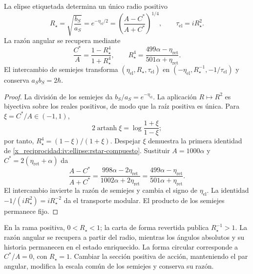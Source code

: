 \begin{proposition}
\label{x_reciprocidad:iv:ellipse:radio-prop}
La elipse etiquetada determina un único radio positivo
\begin{equation}
 R_\star=\sqrt{\frac{b_S}{a_S}}
 =e^{-\eta_{\mathrm{el}}/2}
 =\left(\frac{A-C^*}{A+C^*}\right)^{1/4},
 \qquad \tau_{\mathrm{el}}=iR_\star^2.
 \label{x_reciprocidad:iv:ellipse:rstar}
\end{equation}
La razón angular se recupera mediante
\begin{equation}
 \frac{C^*}{A}=\frac{1-R_\star^4}{1+R_\star^4},
 \qquad
 R_\star^4=
 \frac{499\alpha-\eta_{\mathrm{ret}}}
      {501\alpha+\eta_{\mathrm{ret}}}.
 \label{x_reciprocidad:iv:ellipse:rstar-compuesto}
\end{equation}
El intercambio de semiejes transforma
\((\eta_{\mathrm{el}},R_\star,\tau_{\mathrm{el}})\) en
\((-\eta_{\mathrm{el}},R_\star^{-1},-1/\tau_{\mathrm{el}})\)
y conserva \(a_Sb_S=2\hbar\).
\end{proposition}
\begin{proof}
La división de los semiejes da \(b_S/a_S=e^{-\eta_{\mathrm{el}}}\).
La aplicación \(R\mapsto R^2\) es biyectiva sobre los reales
positivos, de modo que la raíz positiva es única.
Para \(\xi=C^*/A\in(-1,1)\),
\[
 2\operatorname{artanh}\xi
 =\log\frac{1+\xi}{1-\xi};
\]
por tanto, \(R_\star^4=(1-\xi)/(1+\xi)\).
Despejar \(\xi\) demuestra la primera identidad de
\eqref{x_reciprocidad:iv:ellipse:rstar-compuesto}. Sustituir
\(A=1000\alpha\) y
\(C^*=2(\eta_{\mathrm{ret}}+\alpha)\) da
\[
 \frac{A-C^*}{A+C^*}
 =\frac{998\alpha-2\eta_{\mathrm{ret}}}
        {1002\alpha+2\eta_{\mathrm{ret}}}
 =\frac{499\alpha-\eta_{\mathrm{ret}}}
        {501\alpha+\eta_{\mathrm{ret}}}.
\]
El intercambio invierte la razón de semiejes y cambia el
signo de \(\eta_{\mathrm{el}}\). La identidad
\(-1/(iR_\star^2)=iR_\star^{-2}\) da el transporte
modular. El producto de los semiejes permanece fijo.
\end{proof}

En la rama positiva, \(0<R_\star<1\); la carta de forma
revertida publica \(R_\star^{-1}>1\). La razón angular
se recupera a partir del radio, mientras los ángulos absolutos
y su historia permanecen en el estado enriquecido.
La forma circular corresponde a \(C^*/A=0\), con
\(R_\star=1\). Cambiar la sección positiva de acción,
manteniendo el par angular, modifica la escala común de
los semiejes y conserva su razón.

